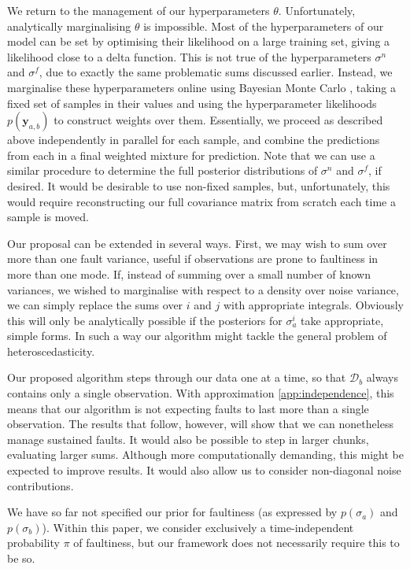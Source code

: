 \documentclass[letterpaper]{article}
\newcommand{\cm}[1]{\ensuremath{\mathcal{#1}}}
\newcommand{\bm}[1]{\ensuremath{\mathbf{#1}}}
\newcommand{\data}{\ensuremath{\cm{D}}}
\newcommand{\vect}[1]{\bm{#1}}
\newcommand{\vy}{\vect{y}}
\begin{document}
We return to the management of our hyperparameters
$\theta$. Unfortunately, analytically marginalising $\theta$ is
impossible. Most of the hyperparameters of our model can be set by
optimising their likelihood on a large training set, giving a
likelihood close to a delta function. This is not true of the
hyperparameters $\sigma^n$ and $\sigma^f$, due to exactly the same
problematic sums discussed earlier. Instead, we marginalise these
hyperparameters online using Bayesian Monte Carlo \cite{BZMonteCarlo,OsborneIPSN}, %
taking a fixed set of samples in their values
and using the hyperparameter likelihoods $p(\vy_{a,b})$ to construct
weights over them. Essentially, we proceed as described above
independently in parallel for each sample, and combine the predictions
from each in a final weighted mixture for prediction. Note that we can
use a similar procedure \cite{garnettosborne} to determine the full
posterior distributions of $\sigma^n$ and $\sigma^f$, if desired.  It
would be desirable to use non-fixed samples, but, unfortunately, this
would require reconstructing our full covariance matrix from
scratch each time a sample is moved.

Our proposal can be extended in several ways. First, we may wish
to sum over more than one fault variance, useful if
observations are prone to faultiness in more than one mode.  If, instead of summing over a small number of known variances, we
wished to marginalise with respect to a density over noise variance,
we can simply replace the sums over $i$ and $j$ with appropriate
integrals. Obviously this will only be analytically possible if the
posteriors for $\sigma_a^i$ take appropriate, simple forms.  In such a way our algorithm might tackle the general problem of
heteroscedasticity.


Our proposed algorithm steps through our data one at a time, so that
$\data_b$ always contains only a single observation. 
With approximation \ref{app:independence}, this means that our algorithm is not expecting faults to last more than a single observation. The results that follow, however, will show that we can nonetheless manage sustained faults. 
It would also
be possible to step in larger chunks, evaluating larger
sums. Although more computationally demanding, this might be expected
to improve results. It would also allow us to consider non-diagonal
noise contributions.

We have so far not specified our prior for faultiness (as expressed by
$p(\sigma_a)$ and $p(\sigma_b)$). Within this paper, we consider
exclusively a time-independent probability $\pi$ of faultiness, but our framework does not necessarily require this to be so. 
\end{document}
